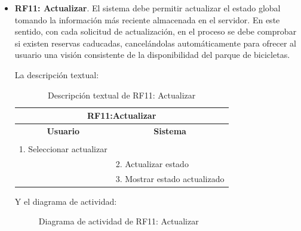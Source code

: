 \begin{itemize}
	\item \textbf{RF11: Actualizar}. El sistema debe permitir actualizar el estado global tomando la información más reciente almacenada en el servidor. En este sentido, con cada solicitud de actualización, en el proceso se debe comprobar si existen reservas caducadas, cancelándolas automáticamente para ofrecer al usuario una visión consistente de la disponibilidad del parque de bicicletas.
	
	La descripción textual:
	\begin{table}[h]
		\centering	
		\begin{tabular}{|l|l|}
			\hline
			\multicolumn{2}{|c|}{\textbf{RF11:Actualizar}} \\ \hline
			\multicolumn{1}{|c|}{\textbf{Usuario}} & \multicolumn{1}{c|}{\textbf{Sistema}} \\ \hline
			[Pto. inclusión: RF02: Loguear usuario] &\\ \hline
			1. Seleccionar actualizar &\\ \hline
			& 2. Actualizar estado\\ \hline
			& 3. Mostrar estado actualizado \\ \hline 	
		\end{tabular}
		\caption{Descripción textual de RF11: Actualizar}
		\label{tab:tablaDescTextualRF11}
	\end{table}
	
	Y el diagrama de actividad:
	\begin{figure}[!htb]
		\centering
		\caption{Diagrama de actividad de RF11: Actualizar}
		\label{fig:diagramaActividad_RF11}
	\end{figure}

\end{itemize}

